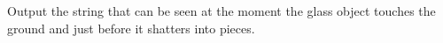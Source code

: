 
  Output the string that can be seen at the moment the glass object touches the ground and just before it shatters into pieces.
